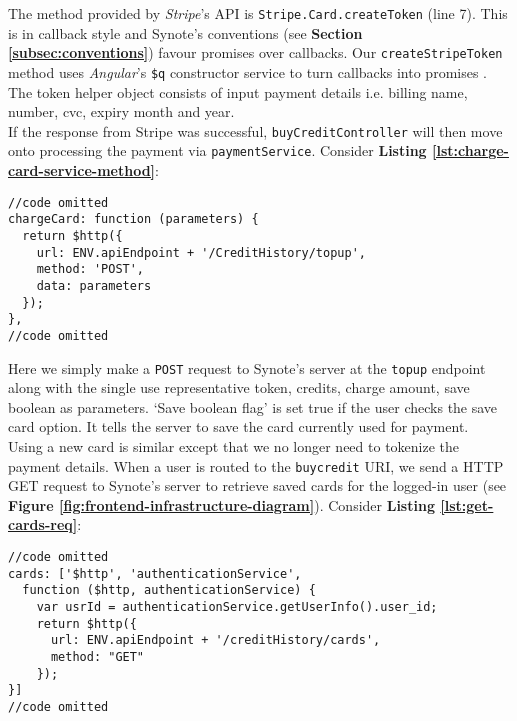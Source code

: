 The method provided by \textit{Stripe}’s API is \texttt{Stripe.Card.createToken} (line 7). This is in callback style and Synote’s conventions (see \textbf{Section \ref{subsec:conventions}}) favour promises over callbacks. Our \texttt{createStripeToken} method uses \textit{Angular}’s \texttt{\$q} constructor service to turn callbacks into promises \cite{jdotjdot} \cite{angularjsq}. The token helper object consists of input payment details i.e. billing name, number, cvc, expiry month and year.\\

If the response from Stripe was successful, \texttt{buyCreditController} will then move onto processing the payment via \texttt{paymentService}. Consider \textbf{Listing \ref{lst:charge-card-service-method}}:\\

\begin{listing}[H]
\begin{verbatim}
//code omitted
chargeCard: function (parameters) {
  return $http({
    url: ENV.apiEndpoint + '/CreditHistory/topup',
    method: 'POST',
    data: parameters
  });
},
//code omitted
\end{verbatim}
\label{lst:charge-card-service-method}
\end{listing}

Here we simply make a \texttt{POST} request to Synote’s server at the \texttt{topup} endpoint along with the single use representative token, credits, charge amount, save boolean as parameters. `Save boolean flag' is set true if the user checks the save card option. It tells the server to save the card currently used for payment.\\

Using a new card is similar except that we no longer need to tokenize the payment details. When a user is routed to the \texttt{buycredit} URI, we send a HTTP GET request to Synote’s server to retrieve saved cards for the logged-in user (see \textbf{Figure \ref{fig:frontend-infrastructure-diagram}}). Consider \textbf{Listing \ref{lst:get-cards-req}}:\\

\begin{listing}[H]
\begin{verbatim}
//code omitted
cards: ['$http', 'authenticationService',
  function ($http, authenticationService) {
    var usrId = authenticationService.getUserInfo().user_id;
    return $http({
      url: ENV.apiEndpoint + '/creditHistory/cards',
      method: "GET"
    });
}]
//code omitted
\end{verbatim}
\label{lst:get-cards-req}
\end{listing}


